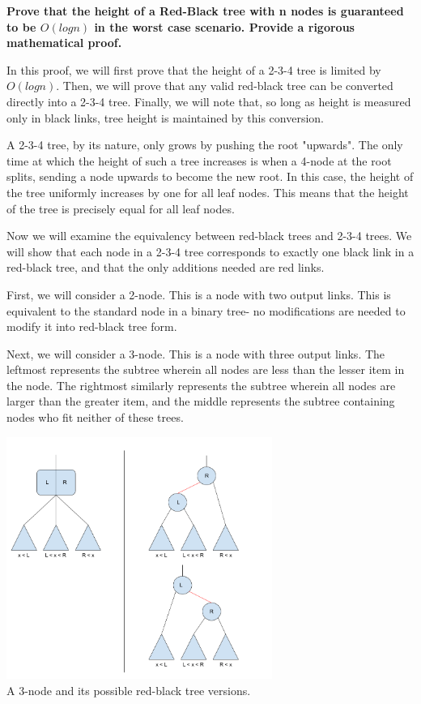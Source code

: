 \documentclass[12pt]{amsart}
\begin{document}
    \textbf{Prove that the height of a Red-Black tree with
    n nodes is guaranteed to be $O(log n)$ in the worst
    case scenario. Provide a rigorous mathematical proof.}
    
    In this proof, we will first prove that the height of a
    2-3-4 tree is limited by $O(log n)$. Then, we will prove
    that any valid red-black tree can be converted directly into
    a 2-3-4 tree. Finally, we will note that, so long as height
    is measured only in black links, tree height is maintained
    by this conversion.

    A 2-3-4 tree, by its nature, only grows by pushing the root
    "upwards". The only time at which the height of such a tree
    increases is when a 4-node at the root splits, sending a
    node upwards to become the new root. In this case, the
    height of the tree uniformly increases by one for all leaf
    nodes. This means that the height of the tree is precisely
    equal for all leaf nodes.

    Now we will examine the equivalency between red-black trees
    and 2-3-4 trees. We will show that each node in a 2-3-4 tree
    corresponds to exactly one black link in a red-black tree,
    and that the only additions needed are red links.

    First, we will consider a 2-node. This is a node with two
    output links. This is equivalent to the standard node in a
    binary tree- no modifications are needed to modify it into
    red-black tree form.

    Next, we will consider a 3-node. This is a node with three
    output links. The leftmost represents the subtree wherein
    all nodes are less than the lesser item in the node. The
    rightmost similarly represents the subtree wherein all nodes
    are larger than the greater item, and the middle represents
    the subtree containing nodes who fit neither of these trees.

\begin{center}
    \includegraphics[width=0.65\textwidth]{rb_tree_1} \\
    A 3-node and its possible red-black tree versions. \\
    \vskip 1cm
\end{center}
\end{document}
